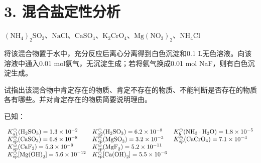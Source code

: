\section*{3. 混合盐定性分析}
$
\left(\mathrm{NH} _ {4}\right) _ {2} \mathrm{SO} _ {3} 、 \mathrm{NaCl} 、 \mathrm{CaSO} _ {4} 、 \mathrm{K} _ {2} \mathrm{CrO} _ {4} 、 \mathrm{Mg} \left(\mathrm{NO} _ {3}\right) _ {2} 、 \mathrm{NH} _ {4} \mathrm{Cl}
$

将该混合物置于⽔中，充分反应后离⼼分离得到⽩⾊沉淀和0.1 L⽆⾊溶液。向该溶液中通⼊0.01 mol氨⽓，⽆沉淀⽣成；若将氨⽓换成0.01 mol NaF，则有⽩⾊沉淀⽣成。

试指出该混合物中肯定存在的物质、肯定不存在的物质、不能判断是否存在的物质各有哪些。并对肯定存在的物质简要说明理由。

已知：

$
\begin{array}{l l l} K _ {a 1} ^ {\ominus} (\mathrm{H} _ {2} \mathrm{SO} _ {3}) = 1. 3 \times 1 0 ^ {- 2} & K _ {a 2} ^ {\ominus} (\mathrm{H} _ {2} \mathrm{SO} _ {3}) = 6. 2 \times 1 0 ^ {- 8} & K _ {b} ^ {\ominus} (\mathrm{NH} _ {3} \cdot \mathrm{H} _ {2} \mathrm{O}) = 1. 8 \times 1 0 ^ {- 5} \\ K _ {s p} ^ {\ominus} (\mathrm{CaSO} _ {3}) = 6. 8 \times 1 0 ^ {- 8} & K _ {s p} ^ {\ominus} (\mathrm{MgSO} _ {3}) = 3. 2 \times 1 0 ^ {- 3} & K _ {s p} ^ {\ominus} (\mathrm{CaCrO} _ {4}) = 7. 1 \times 1 0 ^ {- 4} \\ K _ {s p} ^ {\ominus} (\mathrm{CaF} _ {2}) = 5. 3 \times 1 0 ^ {- 9} & K _ {s p} ^ {\ominus} (\mathrm{MgF} _ {2}) = 5. 2 \times 1 0 ^ {- 1 1} \\ K _ {s p} ^ {\ominus} [ \mathrm{Mg(OH)} _ {2} ] = 5. 6 \times 1 0 ^ {- 1 2} & K _ {s p} ^ {\ominus} [ \mathrm{Ca(OH)} _ {2} ] = 5. 5 \times 1 0 ^ {- 6} \end{array}
$
